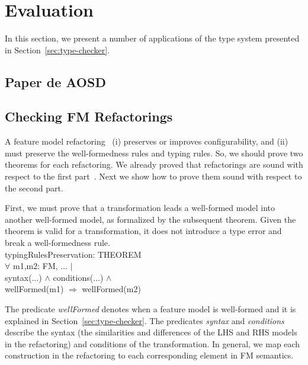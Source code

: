 \section{Evaluation}
\label{sec:evaluation}

In this section, we present a number of applications of the type system presented in Section~\ref{sec:type-checker}.

\subsection{Paper de AOSD}

\subsection{Checking FM Refactorings}

A feature model refactoring~\cite{Alves:2006aa} (i) preserves or improves configurability, and (ii) must preserve the well-formedness rules and typing rules.
So, we should prove two theorems for each refactoring. We already proved that refactorings are sound with respect to the first part~\cite{Gheyi:2006aa-2}. Next we show how to prove them sound with respect to the second part.

First, we must prove that a transformation leads a well-formed model into another well-formed model, as formalized by the subsequent theorem. Given the theorem is valid for a transformation, it does not introduce a type error and break a well-formedness rule. \\
\vspace{0.2cm}
				typingRulesPreservation: THEOREM \\
 				$\forall$ m1,m2: FM, $\ldots$ $|$ \\
        syntax($\ldots$) $\wedge$ conditions($\ldots$) $\wedge$ \\
        wellFormed(m1) $\Rightarrow$ wellFormed(m2) \\
\vspace{0.2cm}

The predicate \emph{wellFormed} denotes when a feature model is well-formed and it is explained in Section~\ref{sec:type-checker}. The predicates \emph{syntax} and \emph{conditions} describe the syntax (the similarities and differences of the LHS and RHS models in the refactoring) and conditions of the transformation. In general, we map each construction in the refactoring to each corresponding element in FM semantics. 

